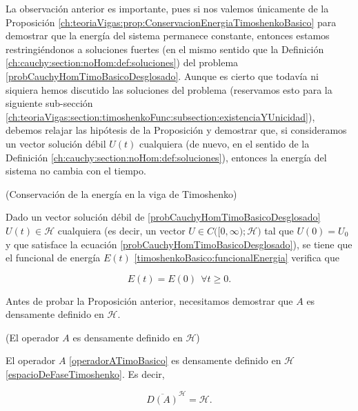La observación anterior es importante, pues si nos valemos únicamente de la Proposición \eqref{ch:teoriaVigas:prop:ConservacionEnergiaTimoshenkoBasico} para demostrar que la energía del sistema permanece constante, entonces estamos restringiéndonos a soluciones fuertes (en el mismo sentido que la Definición \eqref{ch:cauchy:section:noHom:def:soluciones}) del problema \ref{probCauchyHomTimoBasicoDesglosado}. Aunque es cierto que todavía ni siquiera hemos discutido las soluciones del problema (reservamos esto para la siguiente sub-sección \ref{ch:teoriaVigas:section:timoshenkoFunc:subsection:existenciaYUnicidad}), debemos relajar las hipótesis de la Proposición y demostrar que, si consideramos un vector solución débil $U(t)$ cualquiera (de nuevo, en el sentido de la Definición \eqref{ch:cauchy:section:noHom:def:soluciones}), entonces la energía del sistema no cambia con el tiempo.\\

\begin{Proposicion}{(Conservación de la energía en la viga de Timoshenko)}
\label{ch:teoriaVigas:prop:ConservacionEnergiaTimoshenkoBasicoRelajado}

    Dado un vector solución débil de \eqref{probCauchyHomTimoBasicoDesglosado} $U(t) \in \mathcal{H}$ cualquiera (es decir, un vector $U \in C\big([0, \infty); \mathcal{H} \big)$ tal que $U(0) = U_0$ y que satisface la ecuación \eqref{probCauchyHomTimoBasicoDesglosado}), se tiene que el funcional de energía $E(t)$ \eqref{timoshenkoBasico:funcionalEnergia} verifica que

    \[E(t) = E(0) \ \  \forall t \geq 0.\]
\end{Proposicion}

Antes de probar la Proposición anterior, necesitamos demostrar que $A$ es densamente definido en $\mathcal{H}$.\\

\begin{Proposicion}{(El operador $A$ es densamente definido en $\mathcal{H}$)}
\label{ch:teoriaVigas:prop:AesDensamenteDef}

    El operador $A$ \eqref{operadorATimoBasico} es densamente definido en $\mathcal{H}$ \eqref{espacioDeFaseTimoshenko}. Es decir,

    \[\overline{D(A)}^{\mathcal{H}} = \mathcal{H}.\]
\end{Proposicion}

